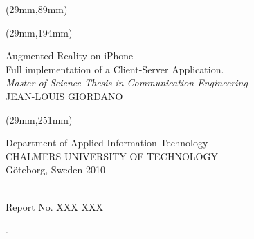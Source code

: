 \documentclass[11pt,a4paper,twoside,bibliography=totoc,version=first,index=totoc]{scrbook}
\begin{document}
	\providecommand{\thesisauthor}{JEAN-LOUIS GIORDANO}
	\providecommand{\thesistitle}{Augmented Reality on iPhone}
	\providecommand{\thesissubtitle}{Full implementation of a Client-Server Application.}
	\providecommand{\thesisdepartment}{Applied Information Technology }
	\providecommand{\thesisprogram}{Communication Engineering}
	\providecommand{\thesisrepro}{Department of Applied Information Technology}
	\providecommand{\thesisyear}{2010}
	\providecommand{\reportnumber}{XXX XXX}
	
\begin{titlepage}
\begin{center}


\textblockorigin{0mm}{0mm} 
\begin{textblock*}{14cm}(29mm,89mm)
\end{textblock*}

\end{center}

\begin{textblock*}{14cm}(29mm,194mm)
\noindent
\raggedright
\huge{\thesistitle}\\ 
\vspace{0.0cm} 
\Large{\thesissubtitle}\\
\vspace{0.4cm} 
\large{\textit{Master of Science Thesis in \thesisprogram}}\\
\vspace{0.6cm}
\LARGE{\thesisauthor}
\end{textblock*}

\begin{textblock*}{14cm}(29mm,251mm)
\normalsize{
\noindent
\raggedright
Department of \thesisdepartment\\
CHALMERS UNIVERSITY OF TECHNOLOGY\\
G\"oteborg, Sweden \thesisyear}\\
Report No. \reportnumber
\end{textblock*}
.
\end{titlepage}
\end{document}
